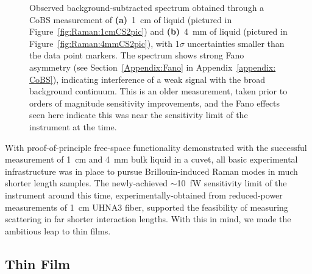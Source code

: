 \begin{figure}[h!]
\begin{subfigure}[b]{0.49\textwidth}
    \caption{}
    \label{fig:Raman:4mmCS2}
  \end{subfigure}
  \caption[\ac{CoBS} measurements of \SI{1}{\centi\meter} and \SI{4}{\milli\meter} liquid .]{Observed background-subtracted spectrum obtained through a \ac{CoBS} measurement of \textbf{(a)}~\SI{1}{\centi\meter} of liquid  (pictured in Figure~\ref{fig:Raman:1cmCS2pic}) and \textbf{(b)}~\SI{4}{\milli\meter} of liquid  (pictured in Figure~\ref{fig:Raman:4mmCS2pic}), with 1\(\sigma\) uncertainties smaller than the data point markers. The spectrum shows strong Fano asymmetry (see Section~\ref{Appendix:Fano} in Appendix~\ref{appendix: CoBS}), indicating interference of a weak signal with the broad background continuum. This is an older measurement, taken prior to orders of magnitude sensitivity improvements, and the Fano effects seen here indicate this was near the sensitivity limit of the instrument at the time.}
  \label{fig:Raman:CS2Cuvet}
\end{figure}

With proof-of-principle free-space functionality demonstrated with the successful measurement of \SI{1}{\centi\meter} and \SI{4}{\milli\meter} bulk liquid  in a cuvet, all basic experimental infrastructure was in place to pursue Brillouin-induced Raman modes in much shorter length samples. The newly-achieved \(\sim\)\SI{10}{\femto\watt} sensitivity limit of the instrument around this time, experimentally-obtained from reduced-power measurements of \SI{1}{\centi\meter} \ac{UHNA3} fiber, supported the feasibility of measuring scattering in far shorter interaction lengths. With this in mind, we made the ambitious leap to thin films.

\subsection{\texorpdfstring{}{TeO2} Thin Film}
\label{subsec:Raman:Target:TeO2}

